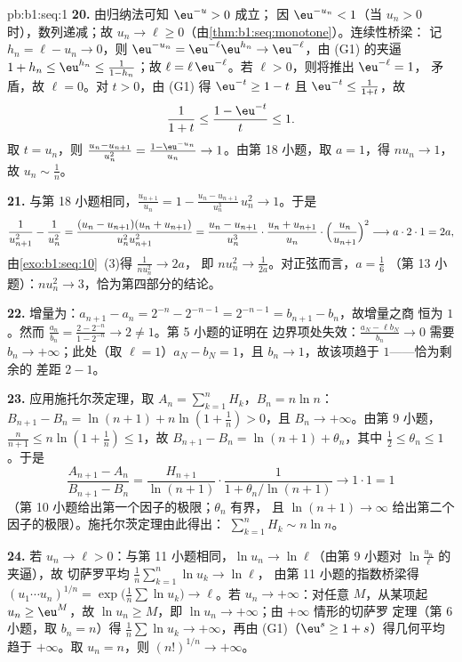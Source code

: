 \begin{solution}{pb:b1:seq:1}
\textbf{20.} 由归纳法可知 $\eu^{-u} > 0$ 成立；
因 $\eu^{-u_n} < 1$（当 $u_n > 0$ 时），数列递减；故 $u_n \to
\ell \geq 0$（由\cref{thm:b1:seq:monotone}）。连续性桥梁：
记 $h_n = \ell - u_n \to 0$，则 $\eu^{-u_n} = \eu^{-\ell}
\eu^{h_n} \to \eu^{-\ell}$，由 (G1) 的夹逼 $1 + h_n \leq
\eu^{h_n} \leq \frac{1}{1 - h_n}$；故 $\ell = \ell\,
\eu^{-\ell}$。若 $\ell > 0$，则将推出 $\eu^{-\ell} = 1$，
矛盾，故 $\ell = 0$。对 $t > 0$，由 (G1) 得 $\eu^{-t} \geq 1 - t$
且 $\eu^{-t} \leq \frac{1}{1 + t}$，故
\[
\frac{1}{1 + t} \leq \frac{1 - \eu^{-t}}{t} \leq 1 .
\]
取 $t = u_n$，则 $\frac{u_n - u_{n+1}}{u_n^2} = \frac{1 -
\eu^{-u_n}}{u_n} \to 1$。由第 18 小题，取 $a = 1$，得 $n u_n \to
1$，故 $u_n \sim \frac1n$。

\textbf{21.} 与第 18 小题相同，$\frac{u_{n+1}}{u_n} = 1 -
\frac{u_n - u_{n+1}}{u_n^3}\,u_n^2 \to 1$。于是
\[
\frac{1}{u_{n+1}^2} - \frac{1}{u_n^2}
= \frac{(u_n - u_{n+1})(u_n + u_{n+1})}{u_n^2 u_{n+1}^2}
= \frac{u_n - u_{n+1}}{u_n^3}\cdot
\frac{u_n + u_{n+1}}{u_n}\cdot
\Bigl(\frac{u_n}{u_{n+1}}\Bigr)^2
\longrightarrow a \cdot 2 \cdot 1 = 2a ,
\]
由\cref{exo:b1:seq:10}~(3)得 $\frac{1}{n u_n^2} \to 2a$，
即 $n u_n^2 \to \frac{1}{2a}$。对正弦而言，$a = \frac16$
（第 13 小题）：$n u_n^2 \to 3$，恰为第四部分的结论。

\textbf{22.} 增量为：$a_{n+1} - a_n = 2^{-n} - 2^{-n-1} =
2^{-n-1} = b_{n+1} - b_n$，故增量之商
恒为 $1$。然而 $\frac{a_n}{b_n} = \frac{2 - 2^{-n}}{1 -
2^{-n}} \to 2 \neq 1$。第 5 小题的证明在
边界项处失效：$\frac{a_N - \ell b_N}{b_n} \to 0$ 需要 $b_n
\to +\infty$；此处（取 $\ell = 1$）$a_N - b_N = 1$，且 $b_n
\to 1$，故该项趋于 $1$——恰为剩余的
差距 $2 - 1$。

\textbf{23.} 应用施托尔茨定理，取 $A_n = \sum_{k=1}^n H_k$，$B_n = n\ln
n$：$B_{n+1} - B_n = \ln(n+1) + n\ln(1 + \frac1n) > 0$，且 $B_n
\to +\infty$。由第 9 小题，$\frac{n}{n+1} \leq n\ln(1 +
\frac1n) \leq 1$，故 $B_{n+1} - B_n = \ln(n+1) + \theta_n$，其中
$\frac12 \leq \theta_n \leq 1$。于是
\[
\frac{A_{n+1} - A_n}{B_{n+1} - B_n}
= \frac{H_{n+1}}{\ln(n+1)}\cdot
\frac{1}{1 + \theta_n/\ln(n+1)} \longrightarrow 1 \cdot 1 = 1
\]
（第 10 小题给出第一个因子的极限；$\theta_n$ 有界，
且 $\ln(n+1) \to \infty$ 给出第二个因子的极限）。施托尔茨定理由此得出：
$\sum_{k=1}^n H_k \sim n\ln n$。

\textbf{24.} 若 $u_n \to \ell > 0$：与第 11 小题相同，$\ln u_n
\to \ln\ell$（由第 9 小题对 $\ln\frac{u_n}{\ell}$ 的夹逼），故
切萨罗平均 $\frac1n\sum_{k=1}^n \ln u_k \to \ln\ell$，
由第 11 小题的指数桥梁得 $(u_1\cdots
u_n)^{1/n} = \exp\bigl(\frac1n\sum\ln u_k\bigr) \to \ell$。若
$u_n \to +\infty$：对任意 $M$，从某项起 $u_n \geq \eu^M$，故
$\ln u_n \geq M$，即 $\ln u_n \to +\infty$；由 $+\infty$ 情形的切萨罗
定理（第 6 小题，取 $b_n = n$）得 $\frac1n\sum \ln u_k \to
+\infty$，再由 (G1)（$\eu^s \geq 1 + s$）得几何平均
趋于 $+\infty$。取 $u_n = n$，则 $(n!)^{1/n} \to +\infty$。


\end{solution}
